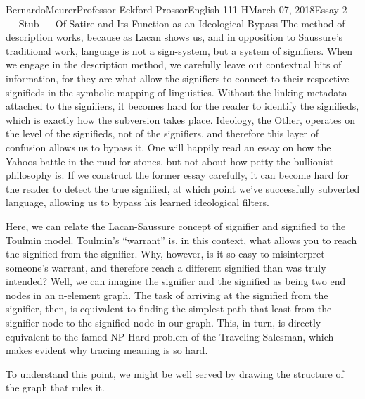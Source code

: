 \documentclass[12pt,letterpaper]{article}
\begin{document}
\begin{mla}{Bernardo}{Meurer}{Professor Eckford-Prossor}{English 111 H}{March 07, 2018}{Essay 2 --- Stub --- Of Satire and Its Function as an Ideological Bypass}
    The method of description works, because as Lacan shows us, and in opposition to Saussure's traditional work, language is not a sign-system, but a system of signifiers. When  we engage in the description method, we carefully leave out contextual bits of information, for they are what allow the signifiers to connect to their respective signifieds in the symbolic mapping of linguistics. Without the linking metadata attached to the signifiers, it becomes hard for the reader to identify the signifieds, which is exactly how the subversion takes place. Ideology, the Other, operates on the level of the signifieds, not of the signifiers, and therefore this layer of confusion allows us to bypass it. One will happily read an essay on how the Yahoos battle in the mud for stones, but not about how petty the bullionist philosophy is. If we construct the former essay carefully, it can become hard for the reader to detect the true signified, at which point we've successfully subverted language, allowing us to bypass his learned ideological filters.

     Here, we can relate the Lacan-Saussure concept of signifier and signified to the Toulmin model. Toulmin's ``warrant'' is, in this context, what allows you to reach the signified from the signifier. Why, however, is it so easy to misinterpret someone's warrant, and therefore reach a different signified than was truly intended? Well, we can imagine the signifier and the signified as being two end nodes in an n-element graph. The task of arriving at the signified from the signifier, then, is equivalent to finding the simplest path that least from the signifier node to the signified node in our graph. This, in turn, is directly equivalent to the famed NP-Hard problem of the Traveling Salesman, which makes evident why tracing meaning is so hard.

    To understand this point, we might be well served by drawing the structure of the graph that rules it.
    \begin{figure}[H]
        \centering
\end{figure}
\end{mla}
\end{document}
